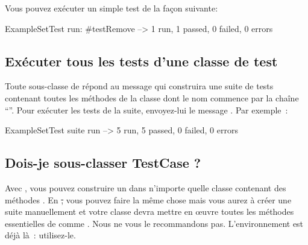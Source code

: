 \documentclass[a4paper,10pt,twoside]{book}
\begin{document}
Vous pouvez exécuter un simple test de la façon suivante:


\begin{code}{}
ExampleSetTest run: #testRemove --> 1 run, 1 passed, 0 failed, 0 errors
\end{code}

\subsection{Exécuter tous les tests d'une classe de test}

Toute sous-classe de  répond au message  qui construira 
une suite de tests contenant toutes les méthodes de la classe dont le nom commence par la chaîne ``''.
Pour exécuter les tests de la suite, envoyez-lui le message .
Par exemple~:

\begin{code}{}
ExampleSetTest suite run --> 5 run, 5 passed, 0 failed, 0 errors
\end{code}

\subsection{Dois-je sous-classer TestCase ?}
Avec \JUnit{}, vous pouvez construire un  dans n'importe quelle classe contenant 
des méthodes . En \st, vous pouvez faire la même chose mais vous aurez à créer une suite 
manuellement et votre classe devra mettre en {\oe}uvre toutes les méthodes essentielles de  
comme .
Nous ne vous le recommandons pas. L'environnement est déjà là~: utilisez-le.
\end{document}
